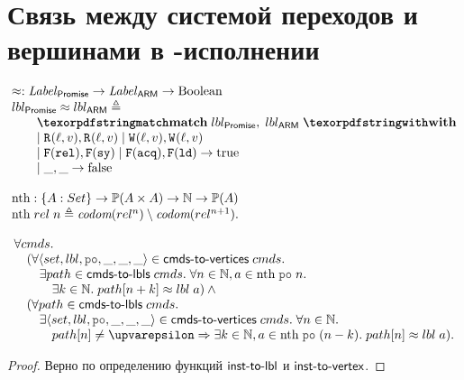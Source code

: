 \section{Связь между системой переходов и вершинами в \ARM-исполнении}

\[\inarr{
  \approx : \Label_{\Promise} \rightarrow \Label_{\ARM} \rightarrow {\rm Boolean} \\
  lbl_{\Promise} \approx lbl_{\ARM} \defeq \\
  \qquad \kw{match} \; lbl_{\Promise}, \; lbl_{\ARM} \; \kw{with} \\
  \qquad
    \begin{array}{@{}l}
      | \; \rlab{}{\loc}{\val}, \rlab{}{\loc}{\val} \;
      | \; \wlab{}{\loc}{\val}, \wlab{}{\loc}{\val} \\
      | \; \flab{\rel}, \flab{\SY} \;
      | \; \flab{\acq}, \flab{\LD} \rightarrow {\rm true} \\
      | \; \_, \_ \rightarrow {\rm false}
    \end{array} \\
  \\
  \nthf : \{A : Set\} \rightarrow \Pset(A \times A) \rightarrow \mathbb{N} \rightarrow \Pset(A) \\
  \nthf \; rel \; n \defeq \codom{rel^{n}} \setminus \codom{rel^{n + 1}}.
}\]

\begin{theorem}
\[\inarr{
\forall \Carm. \\
\quad (\forall \tup{set, lbl, \lPO, \_, \_, \_} \in \cmdsToVrtxs \; \Carm. \\
\qquad \exists path \in \cmdsToLbls \; \Carm. \; \forall n \in \mathbb{N}, a \in \nthf \; \lPO \; n. \\
\qquad \quad \exists k \in \mathbb{N}. \; path[n + k] \approx lbl \; a) \land {} \\
\quad (\forall path \in \cmdsToLbls \; \Carm. \\
\qquad \exists \tup{set, lbl, \lPO, \_, \_, \_} \in \cmdsToVrtxs \; \Carm. \;
  \forall n \in \mathbb{N}. \\
\qquad \quad path[n] \neq \epsilon \Rightarrow \exists k \in \mathbb{N}, a \in \nthf \; \lPO \; (n - k). \; path[n] \approx lbl \; a).
}\]
\end{theorem}
\begin{proof}
  Верно по определению функций $\textup{\sf inst-to-lbl}$ и $\textup{\sf inst-to-vertex}$.
\end{proof}
